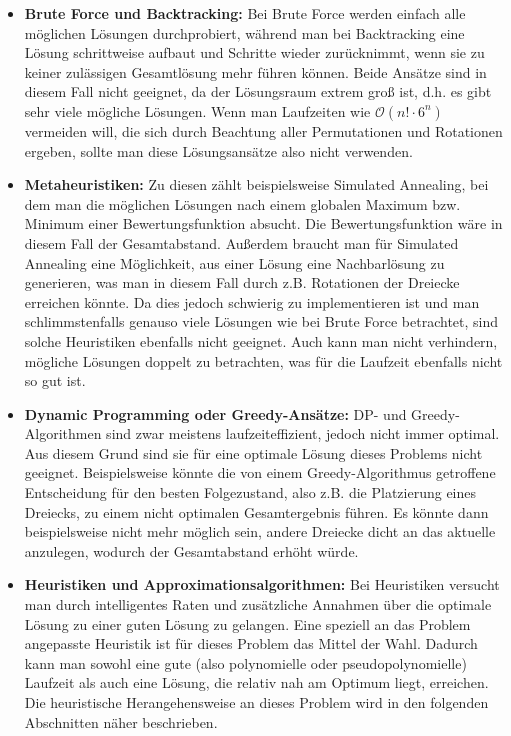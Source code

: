 \documentclass[a4paper, notitlepage, 12pt]{scrartcl}
\begin{document}
 \begin{itemize}
 	\item \textbf{Brute Force und Backtracking:} Bei Brute Force werden einfach alle möglichen Lösungen durchprobiert, während man bei Backtracking eine Lösung schrittweise aufbaut und Schritte wieder zurücknimmt, wenn sie zu keiner zulässigen Gesamtlösung mehr führen können. Beide Ansätze sind in diesem Fall nicht geeignet, da der Lösungsraum extrem groß ist, d.h. es gibt sehr viele mögliche Lösungen. Wenn man Laufzeiten wie $\mathcal{O}(n! \cdot 6^n)$ vermeiden will, die sich durch Beachtung aller Permutationen und Rotationen ergeben, sollte man diese Lösungsansätze also nicht verwenden.
 	\item \textbf{Metaheuristiken:} Zu diesen zählt beispielsweise Simulated Annealing, bei dem man die möglichen Lösungen nach einem globalen Maximum bzw. Minimum einer Bewertungsfunktion absucht. Die Bewertungsfunktion wäre in diesem Fall der Gesamtabstand. Außerdem braucht man für Simulated Annealing eine Möglichkeit, aus einer Lösung eine Nachbarlösung zu generieren, was man in diesem Fall durch z.B. Rotationen der Dreiecke erreichen könnte. Da dies jedoch schwierig zu implementieren ist und man schlimmstenfalls genauso viele Lösungen wie bei Brute Force betrachtet, sind solche Heuristiken ebenfalls nicht geeignet. Auch kann man nicht verhindern, mögliche Lösungen doppelt zu betrachten, was für die Laufzeit ebenfalls nicht so gut ist.
 	\item \textbf{Dynamic Programming oder Greedy-Ansätze:} DP- und Greedy-Algorithmen sind zwar meistens laufzeiteffizient, jedoch nicht immer optimal. Aus diesem Grund sind sie für eine optimale Lösung dieses Problems nicht geeignet. Beispielsweise könnte die von einem Greedy-Algorithmus getroffene Entscheidung für den besten Folgezustand, also z.B. die Platzierung eines Dreiecks, zu einem nicht optimalen Gesamtergebnis führen. Es könnte dann beispielsweise nicht mehr möglich sein, andere Dreiecke dicht an das aktuelle anzulegen, wodurch der Gesamtabstand erhöht würde.
 	\item \textbf{Heuristiken und Approximationsalgorithmen:} Bei Heuristiken versucht man durch intelligentes Raten und zusätzliche Annahmen über die optimale Lösung zu einer guten Lösung zu gelangen. Eine speziell an das Problem angepasste Heuristik ist für dieses Problem das Mittel der Wahl. Dadurch kann man sowohl eine gute (also polynomielle oder pseudopolynomielle) Laufzeit als auch eine Lösung, die relativ nah am Optimum liegt, erreichen. Die heuristische Herangehensweise an dieses Problem wird in den folgenden Abschnitten näher beschrieben.
 \end{itemize}
\end{document}
